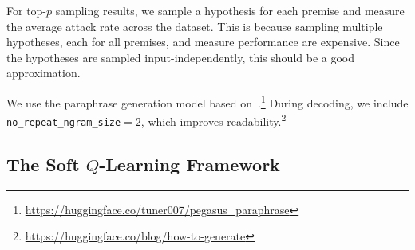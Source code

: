 




For top-$p$ sampling results, we sample a hypothesis for each premise and measure the average attack rate across the dataset. This is because sampling multiple hypotheses, each for all premises, and measure performance are expensive. Since the hypotheses are sampled input-independently, this should be a good approximation.


We use the paraphrase generation model based on~\citet{zhang2019pegasus}.\footnote{\url{https://huggingface.co/tuner007/pegasus_paraphrase}} During decoding, we include \texttt{no\_repeat\_ngram\_size}$=2$, which improves readability.\footnote{\url{https://huggingface.co/blog/how-to-generate}}




\subsection{The Soft $Q$-Learning Framework}





